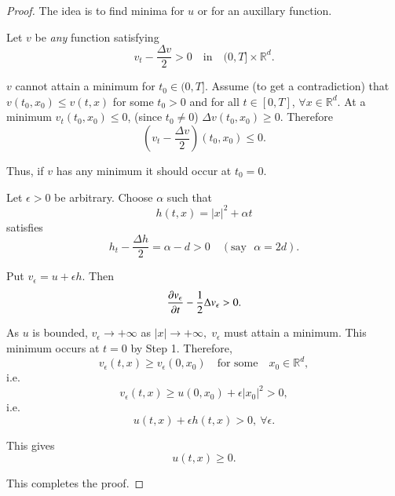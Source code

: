 \begin{proof}
The idea is to find minima for $u$ or for an auxillary function.


\begin{step}
Let $v$ be {\em any} function satisfying
$$
v_{t}-\frac{\Delta v}{2}>0\quad\text{in}\quad (0,T]\times
\mathbb{R}^{d}.
$$
\end{step}

\begin{claim*}
$v$ cannot attain a minimum for $t_{0}\in (0,T]$. Assume (to get a
contradiction) that $v(t_{0},x_{0})\leq v(t,x)$ for some $t_{0}>0$ and
for all $t\in [0,T]$, $\forall x\in \mathbb{R}^{d}$. At a minimum
$v_{t}(t_{0},x_{0})\leq 0$, (since $t_{0}\neq 0$) $\Delta
v(t_{0},x_{0})\geq 0$. Therefore
$$
\left(v_{t}-\frac{\Delta v}{2}\right)(t_{0},x_{0})\leq 0.
$$

Thus, if $v$ has any minimum it should occur at $t_{0}=0$.
\end{claim*}

\begin{step}
Let $\epsilon>0$ be arbitrary. Choose $\alpha$ such that
$$
h(t,x)=|x|^{2}+\alpha t
$$
satisfies\pageoriginale
$$
h_{t}-\frac{\Delta h}{2}=\alpha -d>0\quad(\text{say~ }\alpha =2d).
$$

Put $v_{\epsilon}=u+\epsilon h$. Then
$$
\frac{\partial v_{\epsilon}}{\partial t}-\frac{1}{2}\Delta v_{\epsilon}>0.
$$

As $u$ is bounded, $v_{\epsilon}\to +\infty$ as $|x|\to +\infty,\;
v_{\epsilon}$ must attain a minimum. This minimum occurs at $t=0$ by
Step 1. Therefore,
$$
v_{\epsilon}(t,x)\geq v_{\epsilon}(0,x_{0})\quad\text{for some}\quad
x_{0}\in \mathbb{R}^{d},
$$
i.e.
$$
v_{\epsilon}(t,x)\geq u(0,x_{0})+\epsilon|x_{0}|^{2}>0,
$$
i.e.
$$
u(t,x)+\epsilon h(t,x)>0,\ \forall \epsilon.
$$

This gives
$$
u(t,x)\geq 0.
$$
\end{step}

This completes the proof.
\end{proof}

